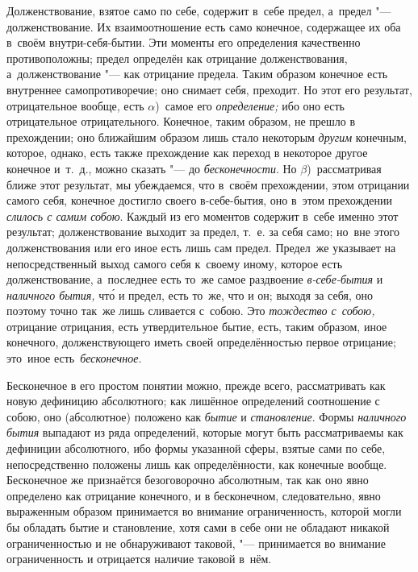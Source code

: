 Долженствование, взятое само по себе, содержит в~себе предел, а~предел "---
долженствование. Их взаимоотношение есть само конечное, содержащее их оба
в~своём внутри-себя-бытии. Эти моменты его определения качественно
противоположны; предел определён как отрицание долженствования,
а~долженствование "--- как отрицание предела. Таким образом конечное есть
внутреннее самопротиворечие; оно снимает себя, преходит. Но этот его результат,
отрицательное вообще, есть $\alpha$)~самое его {\em определение;} ибо оно есть
отрицательное отрицательного. Конечное, таким образом, не прешло в прехождении;
оно ближайшим образом лишь стало некоторым {\em другим} конечным, которое,
однако, есть также прехождение как переход в некоторое другое конечное и~т.~д.,
можно сказать "--- до {\em бесконечности}. Но $\beta$)~рассматривая ближе этот
результат, мы убеждаемся, что в~своём прехождении, этом отрицании самого себя,
конечное достигло своего в-себе-бытия, оно в~этом прехождении
{\em слилось с самим собою}. Каждый из его моментов содержит в~себе именно этот
результат; долженствование выходит за предел, т.~е. за себя само; но~вне этого
долженствования или его иное есть лишь сам предел. Предел~же указывает
на непосредственный выход самого себя к~своему иному, которое есть
долженствование, а~последнее есть то~же самое раздвоение {\em в-себе-бытия} и
{\em наличного бытия,} чт\'{о} и предел, есть то~же, что и он; выходя за себя,
оно поэтому точно так~же лишь сливается с~собою. Это {\em тождество с~собою,}
отрицание отрицания, есть утвердительное бытие, есть, таким образом, иное
конечного, долженствующего иметь своей определённостью первое отрицание;
это~иное есть~{\em бесконечное}.


Бесконечное в его простом понятии можно, прежде всего, рассматривать как новую
дефиницию абсолютного; как лишённое определений соотношение с собою, оно
(абсолютное) положено как {\em бытие} и {\em становление}. Формы
{\em наличного бытия} выпадают из ряда определений, которые могут быть
рассматриваемы как дефиниции абсолютного, ибо формы указанной сферы, взятые
сами по себе, непосредственно положены лишь как определённости, как конечные
вообще. Бесконечное же признаётся безоговорочно абсолютным, так как оно явно
определено как отрицание конечного, и в бесконечном, следовательно, явно
выраженным образом принимается во внимание ограниченность, которой могли бы
обладать бытие и становление, хотя сами в себе они не обладают никакой
ограниченностью и не обнаруживают таковой, "--- принимается во внимание
ограниченность и отрицается наличие таковой в~нём.


